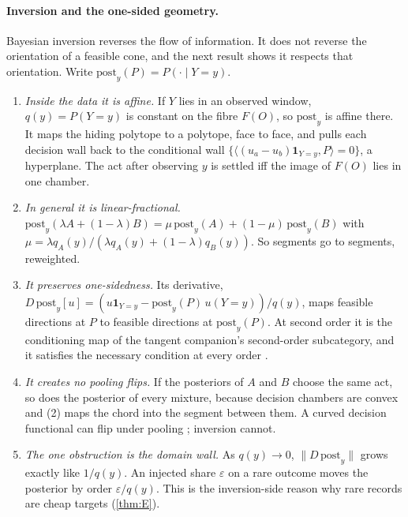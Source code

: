 \paragraph{Inversion and the one-sided geometry.} Bayesian inversion reverses the flow of information. It does not reverse the
orientation of a feasible cone, and the next result shows it respects that orientation. Write $\mathrm{post}_y(P)=P(\cdot\mid Y{=}y)$.

\begin{proposition}\label{prop:invgeom}
\begin{enumerate}
\item[(1)] \emph{Inside the data it is affine.} If $Y$ lies in an observed window, $q(y)=P(Y{=}y)$ is constant on the fibre $F(O)$, so
  $\mathrm{post}_y$ is affine there. It maps the hiding polytope to a polytope, face to face, and pulls each decision wall back to the
  conditional wall $\{\langle(u_a-u_b)\mathbf 1_{Y=y},P\rangle=0\}$, a hyperplane. The act after observing $y$ is settled iff the image of
  $F(O)$ lies in one chamber.
\item[(2)] \emph{In general it is linear-fractional.} $\mathrm{post}_y(\lambda A+(1-\lambda)B)=\mu\,\mathrm{post}_y(A)+(1-\mu)\,\mathrm{post}_y(B)$ with
  $\mu=\lambda q_A(y)/(\lambda q_A(y)+(1-\lambda)q_B(y))$. So segments go to segments, reweighted.
\item[(3)] \emph{It preserves one-sidedness.} Its derivative, $D\,\mathrm{post}_y[u]=(u\mathbf 1_{Y=y}-\mathrm{post}_y(P)\,u(Y{=}y))/q(y)$, maps
  feasible directions at $P$ to feasible directions at $\mathrm{post}_y(P)$. At second order it is the conditioning map of the tangent
  companion's second-order subcategory, and it satisfies the necessary condition at every order \cite[Proposition ``order $k$'']{TangentCompanion}.
\item[(4)] \emph{It creates no pooling flips.} If the posteriors of $A$ and $B$ choose the same act, so does the posterior of every mixture,
  because decision chambers are convex and (2) maps the chord into the segment between them. A curved decision functional can flip under
  pooling \cite[Proposition ``pooling paradox $=$ curvature'']{TangentCompanion}; inversion cannot.
\item[(5)] \emph{The one obstruction is the domain wall.} As $q(y)\to0$, $\|D\,\mathrm{post}_y\|$ grows exactly like $1/q(y)$. An injected
  share $\varepsilon$ on a rare outcome moves the posterior by order $\varepsilon/q(y)$. This is the inversion-side reason why rare records
  are cheap targets (\cref{thm:E}).
\end{enumerate}
\end{proposition}

